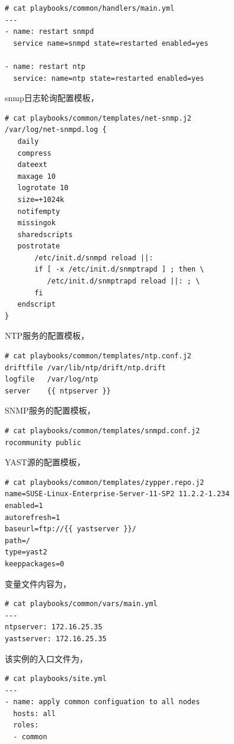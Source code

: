 \begin{verbatim}
# cat playbooks/common/handlers/main.yml
---
- name: restart snmpd
  service name=snmpd state=restarted enabled=yes

- name: restart ntp
  service: name=ntp state=restarted enabled=yes
\end{verbatim}

snmp日志轮询配置模板，
\begin{verbatim}
# cat playbooks/common/templates/net-snmp.j2
/var/log/net-snmpd.log {
   daily
   compress
   dateext
   maxage 10
   logrotate 10
   size=+1024k
   notifempty
   missingok
   sharedscripts
   postrotate
       /etc/init.d/snmpd reload ||:
	   if [ -x /etc/init.d/snmptrapd ] ; then \
	      /etc/init.d/snmptrapd reload ||: ; \
	   fi
   endscript
}
\end{verbatim}

NTP服务的配置模板，
\begin{verbatim}
# cat playbooks/common/templates/ntp.conf.j2
driftfile /var/lib/ntp/drift/ntp.drift
logfile   /var/log/ntp
server    {{ ntpserver }}
\end{verbatim}

SNMP服务的配置模板，
\begin{verbatim}
# cat playbooks/common/templates/snmpd.conf.j2
rocommunity public
\end{verbatim}

YAST源的配置模板，
\begin{verbatim}
# cat playbooks/common/templates/zypper.repo.j2
name=SUSE-Linux-Enterprise-Server-11-SP2 11.2.2-1.234
enabled=1
autorefresh=1
baseurl=ftp://{{ yastserver }}/
path=/
type=yast2
keeppackages=0
\end{verbatim}

变量文件内容为，
\begin{verbatim}
# cat playbooks/common/vars/main.yml
---
ntpserver: 172.16.25.35
yastserver: 172.16.25.35
\end{verbatim}

该实例的入口文件为，
\begin{verbatim}
# cat playbooks/site.yml
---
- name: apply common configuation to all nodes
  hosts: all
  roles:
  - common
\end{verbatim}

